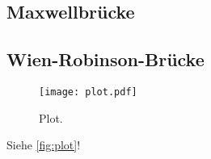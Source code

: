 \subsection{Maxwellbrücke}

\subsection{Wien-Robinson-Brücke}
\begin{figure}
  \centering
  \texttt{[image: plot.pdf]}
  \caption{Plot.}
  \label{fig:plot}
\end{figure}


Siehe \autoref{fig:plot}!
